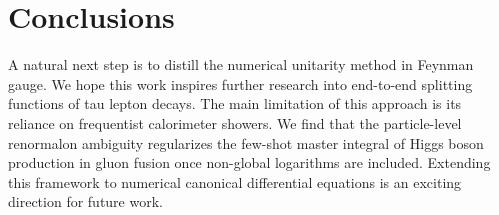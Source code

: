 \section{Conclusions}\label{sec:conclusions}

A natural next step is to distill the numerical unitarity method in
Feynman gauge. We hope this work inspires further research into
end-to-end splitting functions of tau lepton decays. The main limitation
of this approach is its reliance on frequentist calorimeter showers. We
find that the particle-level renormalon ambiguity regularizes the
few-shot master integral of Higgs boson production in gluon fusion once
non-global logarithms are included. Extending this framework to
numerical canonical differential equations is an exciting direction for
future work.

